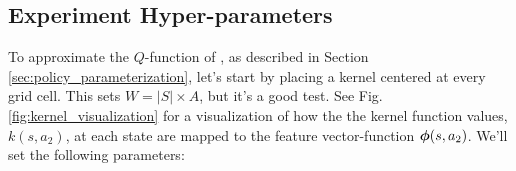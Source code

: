 
    \begin{figure}[htb]
        \begin{center}
        \end{center}
    \end{figure}


    \begin{figure}[htb]
        \begin{center}

        \end{center}
    \end{figure}

\subsection{Experiment Hyper-parameters}
    To approximate the $Q$-function of , as described in Section \ref{sec:policy_parameterization}, let's start
    by placing a kernel centered at every grid cell. This sets $W=|S|\times A$, but it's a good test. See Fig.
    \ref{fig:kernel_visualization} for a visualization of how the the kernel function values, $k(s,a_2)$, at each state
    are mapped to the feature vector-function $\boldsymbol{\mathbb{\phi}}(s, a_2)$. We'll set the following parameters:

